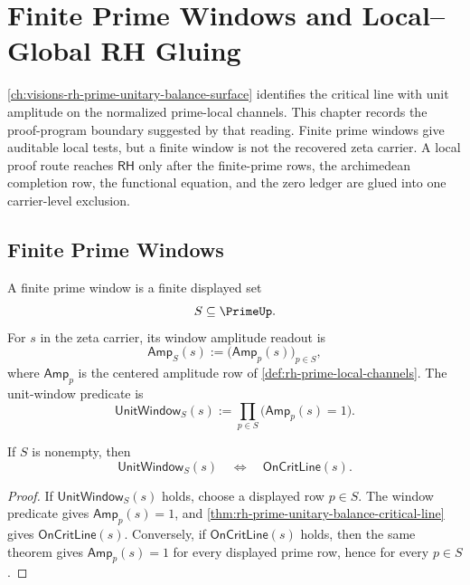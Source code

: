 \chapter{Finite Prime Windows and Local--Global RH Gluing}
\label{ch:visions-rh-finite-prime-window-gluing}

\autoref{ch:visions-rh-prime-unitary-balance-surface} identifies the
critical line with unit amplitude on the normalized prime-local channels.
This chapter records the proof-program boundary suggested by that reading.
Finite prime windows give auditable local tests, but a finite window is not
the recovered zeta carrier. A local proof route reaches $\mathsf{RH}$ only
after the finite-prime rows, the archimedean completion row, the functional
equation, and the zero ledger are glued into one carrier-level exclusion.

\section{Finite Prime Windows}
\label{sec:rh-finite-prime-windows}

\begin{definition}
\label{def:rh-finite-prime-window}
A finite prime window is a finite displayed set
$$
S\subseteq\PrimeUp.
$$
For $s$ in the zeta carrier, its window amplitude readout is
$$
\mathsf{Amp}_{S}(s)
:=
\bigl(\mathsf{Amp}_{p}(s)\bigr)_{p\in S},
$$
where $\mathsf{Amp}_{p}$ is the centered amplitude row of
\autoref{def:rh-prime-local-channels}. The unit-window predicate is
$$
\mathsf{UnitWindow}_{S}(s)
:=
\prod_{p\in S}\bigl(\mathsf{Amp}_{p}(s)=1\bigr).
$$
\end{definition}

\begin{theorem}
\label{thm:rh-nonempty-finite-window-detects-half-surface}
If $S$ is nonempty, then
$$
\mathsf{UnitWindow}_{S}(s)
\quad\Longleftrightarrow\quad
\mathsf{OnCritLine}(s).
$$
\end{theorem}

\begin{proof}
If $\mathsf{UnitWindow}_{S}(s)$ holds, choose a displayed row
$p\in S$. The window predicate gives $\mathsf{Amp}_{p}(s)=1$, and
\autoref{thm:rh-prime-unitary-balance-critical-line} gives
$\mathsf{OnCritLine}(s)$. Conversely, if $\mathsf{OnCritLine}(s)$ holds,
then the same theorem gives $\mathsf{Amp}_{p}(s)=1$ for every displayed
prime row, hence for every $p\in S$.
\end{proof}

